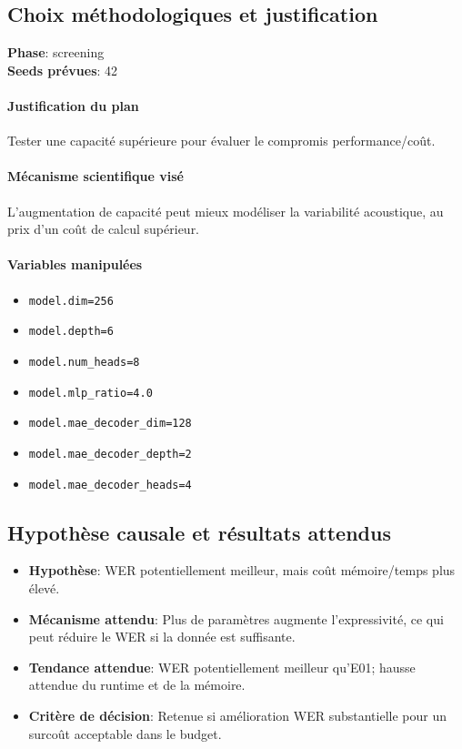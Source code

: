 \documentclass[11pt,a4paper]{article}
\begin{document}
\subsection{Choix méthodologiques et justification}
\textbf{Phase}: screening\\
\textbf{Seeds prévues}: 42\\


\paragraph{Justification du plan}
Tester une capacité supérieure pour évaluer le compromis performance/coût.

\paragraph{Mécanisme scientifique visé}
L'augmentation de capacité peut mieux modéliser la variabilité acoustique, au prix d'un coût de calcul supérieur.

\paragraph{Variables manipulées}
\begin{itemize}
\item \texttt{model.dim=256}
\item \texttt{model.depth=6}
\item \texttt{model.num\_heads=8}
\item \texttt{model.mlp\_ratio=4.0}
\item \texttt{model.mae\_decoder\_dim=128}
\item \texttt{model.mae\_decoder\_depth=2}
\item \texttt{model.mae\_decoder\_heads=4}
\end{itemize}

\subsection{Hypothèse causale et résultats attendus}
\begin{itemize}[leftmargin=1.2cm]
\item \textbf{Hypothèse}: WER potentiellement meilleur, mais coût mémoire/temps plus élevé.
\item \textbf{Mécanisme attendu}: Plus de paramètres augmente l'expressivité, ce qui peut réduire le WER si la donnée est suffisante.
\item \textbf{Tendance attendue}: WER potentiellement meilleur qu'E01; hausse attendue du runtime et de la mémoire.
\item \textbf{Critère de décision}: Retenue si amélioration WER substantielle pour un surcoût acceptable dans le budget.
\end{itemize}
\end{document}
